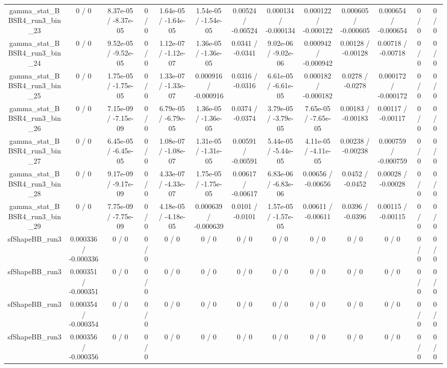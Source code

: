 \documentclass[10pt]{article}
\begin{document}
\begin{table}[htbp]
\begin{center}
\begin{tabular}{|c|c|c|c|c|c|c|c|c|c|c|c|c|}
  gamma_stat_BBSR4_run3_bin_23 & 0 / 0 & 8.37e-05 / -8.37e-05 & 0 / 0 & 1.64e-05 / -1.64e-05 & 1.54e-05 / -1.54e-05 & 0.00524 / -0.00524 & 0.000134 / -0.000134 & 0.000122 / -0.000122 & 0.000605 / -0.000605 & 0.000654 / -0.000654 & 0 / 0 & 0 / 0 \\ 
  gamma_stat_BBSR4_run3_bin_24 & 0 / 0 & 9.52e-05 / -9.52e-05 & 0 / 0 & 1.12e-07 / -1.12e-07 & 1.36e-05 / -1.36e-05 & 0.0341 / -0.0341 & 9.02e-06 / -9.02e-06 & 0.000942 / -0.000942 & 0.00128 / -0.00128 & 0.00718 / -0.00718 & 0 / 0 & 0 / 0 \\ 
  gamma_stat_BBSR4_run3_bin_25 & 0 / 0 & 1.75e-05 / -1.75e-05 & 0 / 0 & 1.33e-07 / -1.33e-07 & 0.000916 / -0.000916 & 0.0316 / -0.0316 & 6.61e-05 / -6.61e-05 & 0.000182 / -0.000182 & 0.0278 / -0.0278 & 0.000172 / -0.000172 & 0 / 0 & 0 / 0 \\ 
  gamma_stat_BBSR4_run3_bin_26 & 0 / 0 & 7.15e-09 / -7.15e-09 & 0 / 0 & 6.79e-05 / -6.79e-05 & 1.36e-05 / -1.36e-05 & 0.0374 / -0.0374 & 3.79e-05 / -3.79e-05 & 7.65e-05 / -7.65e-05 & 0.00183 / -0.00183 & 0.00117 / -0.00117 & 0 / 0 & 0 / 0 \\ 
  gamma_stat_BBSR4_run3_bin_27 & 0 / 0 & 6.45e-05 / -6.45e-05 & 0 / 0 & 1.08e-07 / -1.08e-07 & 1.31e-05 / -1.31e-05 & 0.00591 / -0.00591 & 5.44e-05 / -5.44e-05 & 4.11e-05 / -4.11e-05 & 0.00238 / -0.00238 & 0.000759 / -0.000759 & 0 / 0 & 0 / 0 \\ 
  gamma_stat_BBSR4_run3_bin_28 & 0 / 0 & 9.17e-09 / -9.17e-09 & 0 / 0 & 4.33e-07 / -4.33e-07 & 1.75e-05 / -1.75e-05 & 0.00617 / -0.00617 & 6.83e-06 / -6.83e-06 & 0.00656 / -0.00656 & 0.0452 / -0.0452 & 0.00028 / -0.00028 & 0 / 0 & 0 / 0 \\ 
  gamma_stat_BBSR4_run3_bin_29 & 0 / 0 & 7.75e-09 / -7.75e-09 & 0 / 0 & 4.18e-05 / -4.18e-05 & 0.000639 / -0.000639 & 0.0101 / -0.0101 & 1.57e-05 / -1.57e-05 & 0.00611 / -0.00611 & 0.0396 / -0.0396 & 0.00115 / -0.00115 & 0 / 0 & 0 / 0 \\ 
  sfShapeBB_run3 & 0.000336 / -0.000336 & 0 / 0 & 0 / 0 & 0 / 0 & 0 / 0 & 0 / 0 & 0 / 0 & 0 / 0 & 0 / 0 & 0 / 0 & 0 / 0 & 0 / 0 \\ 
  sfShapeBB_run3 & 0.000351 / -0.000351 & 0 / 0 & 0 / 0 & 0 / 0 & 0 / 0 & 0 / 0 & 0 / 0 & 0 / 0 & 0 / 0 & 0 / 0 & 0 / 0 & 0 / 0 \\ 
  sfShapeBB_run3 & 0.000354 / -0.000354 & 0 / 0 & 0 / 0 & 0 / 0 & 0 / 0 & 0 / 0 & 0 / 0 & 0 / 0 & 0 / 0 & 0 / 0 & 0 / 0 & 0 / 0 \\ 
  sfShapeBB_run3 & 0.000356 / -0.000356 & 0 / 0 & 0 / 0 & 0 / 0 & 0 / 0 & 0 / 0 & 0 / 0 & 0 / 0 & 0 / 0 & 0 / 0 & 0 / 0 & 0 / 0 \\ 

\end{tabular}
\end{center}
\end{table}
\end{document}
